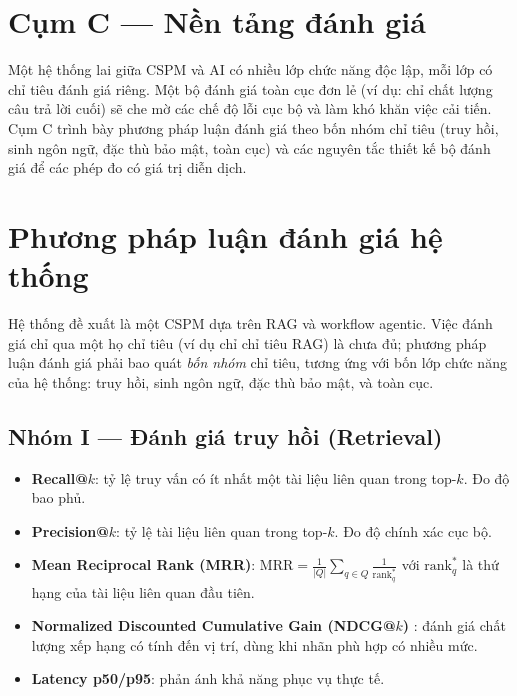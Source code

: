 \section*{Cụm C --- Nền tảng đánh giá}

Một hệ thống lai giữa CSPM và AI có nhiều lớp chức năng độc lập, mỗi lớp có chỉ tiêu đánh giá riêng. Một bộ đánh giá toàn cục đơn lẻ (ví dụ: chỉ chất lượng câu trả lời cuối) sẽ che mờ các chế độ lỗi cục bộ và làm khó khăn việc cải tiến. Cụm C trình bày phương pháp luận đánh giá theo bốn nhóm chỉ tiêu (truy hồi, sinh ngôn ngữ, đặc thù bảo mật, toàn cục) và các nguyên tắc thiết kế bộ đánh giá để các phép đo có giá trị diễn dịch.

\section{Phương pháp luận đánh giá hệ thống}
\label{sec:evaluation-methodology}

Hệ thống đề xuất là một CSPM dựa trên RAG và workflow agentic. Việc đánh giá chỉ qua một họ chỉ tiêu (ví dụ chỉ chỉ tiêu RAG) là chưa đủ; phương pháp luận đánh giá phải bao quát \textit{bốn nhóm} chỉ tiêu, tương ứng với bốn lớp chức năng của hệ thống: truy hồi, sinh ngôn ngữ, đặc thù bảo mật, và toàn cục.

\subsection{Nhóm I --- Đánh giá truy hồi (Retrieval)}
\label{subsec:eval-retrieval}

\begin{itemize}
  \item \textbf{Recall@$k$}: tỷ lệ truy vấn có ít nhất một tài liệu liên quan trong top-$k$. Đo độ bao phủ.
  \item \textbf{Precision@$k$}: tỷ lệ tài liệu liên quan trong top-$k$. Đo độ chính xác cục bộ.
  \item \textbf{Mean Reciprocal Rank (MRR)}: $\mathrm{MRR} = \frac{1}{|Q|}\sum_{q\in Q} \frac{1}{\mathrm{rank}_q^{*}}$ với $\mathrm{rank}_q^{*}$ là thứ hạng của tài liệu liên quan đầu tiên.
  \item \textbf{Normalized Discounted Cumulative Gain (NDCG@$k$)} \cite{voorhees_ndcg}: đánh giá chất lượng xếp hạng có tính đến vị trí, dùng khi nhãn phù hợp có nhiều mức.
  \item \textbf{Latency p50/p95}: phản ánh khả năng phục vụ thực tế.
\end{itemize}

